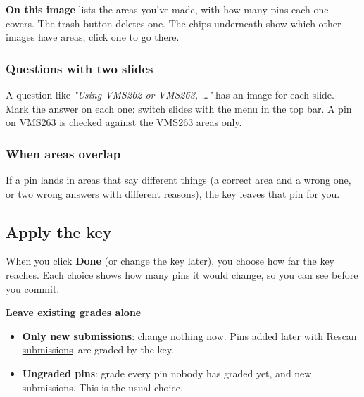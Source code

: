 \textbf{On this image} lists the areas you've made, with how many pins each one covers. The trash button deletes one. The chips underneath show which other images have areas; click one to go there.

\subsubsection{Questions with two slides}\label{sec:answer-key:questions-with-two-slides}

A question like \emph{"Using VMS262 or VMS263, \ldots{}"} has an image for each slide. Mark the answer on each one: switch slides with the menu in the top bar. A pin on VMS263 is checked against the VMS263 areas only.

\subsubsection{When areas overlap}\label{sec:answer-key:when-areas-overlap}

If a pin lands in areas that say different things (a correct area and a wrong one, or two wrong answers with different reasons), the key leaves that pin for you.

\subsection[Apply the key\alsotoc{sec:answer-key:grade-or-suggest}{Grade or suggest}\alsotoc{sec:answer-key:in-a-new-session}{In a new session}]{Apply the key}\label{sec:answer-key:apply-the-key}


When you click \textbf{Done} (or change the key later), you choose how far the key reaches. Each choice shows how many pins it would change, so you can see before you commit.

\textbf{Leave existing grades alone}

\begin{itemize}[topsep=2pt, itemsep=2pt]
\item \textbf{Only new submissions}: change nothing now. Pins added later with \href{https://github.com/agadin/micro-speed-grader/blob/main/docs/help/getting-started.md\#new-and-changed-submissions}{Rescan submissions}\,\onlinemark{} are graded by the key.
\item \textbf{Ungraded pins}: grade every pin nobody has graded yet, and new submissions. This is the usual choice.
\end{itemize}

